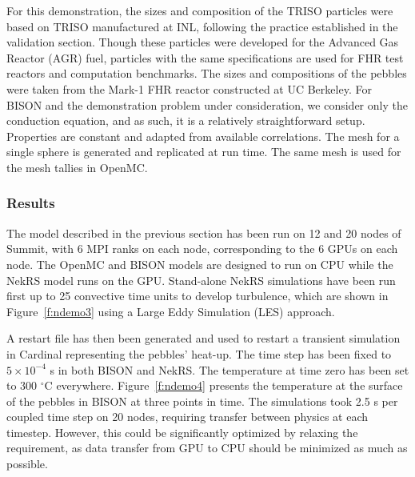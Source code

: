 For this demonstration, the sizes and composition of the TRISO particles were based on TRISO manufactured at INL, following the practice established in the validation section. Though these particles were developed for the Advanced Gas Reactor (AGR) fuel, particles with the same specifications are used for FHR test reactors and computation benchmarks. The sizes and compositions of the pebbles were taken from the Mark-1 FHR reactor constructed at UC Berkeley. For BISON and the demonstration problem under consideration, we consider only the conduction equation, and as such, it is a relatively straightforward setup. Properties are constant and adapted from available correlations. The mesh for a single sphere is generated and replicated at run time. The same mesh is used for the mesh tallies in OpenMC.

\subsubsection{Results}

The model described in the previous section has been run on 12 and 20 nodes of Summit, with 6 MPI ranks on each node, corresponding to the 6 GPUs on each node. The OpenMC and BISON models are designed to run on CPU while the NekRS model runs on the GPU. Stand-alone NekRS simulations have been run first up to 25 convective time units to develop turbulence, which are shown in Figure~\ref{f:ndemo3} using a Large Eddy Simulation (LES) approach.

A restart file has then been generated and used to restart a transient simulation in Cardinal representing the pebbles' heat-up. The time step has been fixed to $5\times 10^{-4}$ s in both BISON and NekRS. The temperature at time zero has been set to 300 $^{\circ}$C everywhere. Figure~\ref{f:ndemo4} presents the temperature at the surface of the pebbles in BISON at three points in time. The simulations took 2.5 s per coupled time step on 20 nodes, requiring transfer between physics at each timestep. However, this could be significantly optimized by relaxing the requirement, as data transfer from GPU to CPU should be minimized as much as possible.

